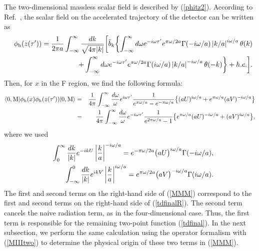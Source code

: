 \documentclass[aps,prd,preprintnumbers,nofootinbib,showpacs]{revtex4}%
\begin{document}
\begin{widetext}
The two-dimensional massless scalar field is described by (\ref{phitz2}). 
According to Ref.~\cite{HuRaval}, the scalar field on the accelerated 
trajectory of the detector can be written as
\begin{eqnarray}
&&\phi_{\rm h}(z(\tau^{\prime}))
=
{1\over 2 \pi a}
\int_{-\infty}^{\infty} {dk\over \sqrt{4\pi |k|}} 
\biggl[\hat b_k\biggl\{
\int_{-\infty}^{\infty} d\omega 
e^{-i\omega \tau'} e^{\pi \omega / 2a}
\Gamma(-{i\omega/ a}) \left|{k/ a}\right|^{i\omega / a}\theta(k) 
\nonumber\\
&&~~~~~~~~~~~~~~~
+
\int_{-\infty}^{\infty} d\omega 
e^{-i\omega \tau'} e^{\pi \omega / 2a}
\Gamma({i\omega / a}) \left|{k / a}\right|^{-i\omega / a} \theta(-k) \biggr\}
+h.c.\biggr].
\label{2MphiO}
\end{eqnarray}
Then, for $x$ in the F region, we find the following formula:
\begin{eqnarray}
\langle 0,{\rm M}| 
\phi_{\rm h}(x) \phi_{\rm h} (z(\tau'))|0, {\rm M}\rangle
&=&{1\over {4 \pi }}\int_{-\infty}^{\infty} {d\omega\over \omega}
e^{i\omega \tau^{\prime}} 
{1\over e^{\pi\omega/a}-e^{-\pi\omega/a}}
\bigl\{
({aU})^{{i\omega / a}} 
+  e^{\pi\omega/a}({aV})^{-i\omega /a}\bigr\}
\nonumber \\
&=&{1\over {4 \pi }}\int_{-\infty}^{\infty} {d\omega\over \omega}
e^{-i\omega \tau^{\prime}} 
{1\over e^{2\pi\omega/a}-1}
\bigl\{e^{\pi\omega/a}
({aU})^{{-i\omega / a}} 
+  ({aV})^{i\omega /a}\bigr\},
\label{MMM}
\end{eqnarray}
where we used  
\begin{eqnarray}
&&\int_0 ^{\infty} {dk \over |k|} e^{-ikU}
\left|{k \over a}\right|^{-i\omega / a}
=
e^{-{\pi \omega / 2a}}
\bigl( { aU} \bigr) ^{{i\omega /a}}
\Gamma(-{i\omega /a}),
\nonumber\\
&&\int_{-\infty} ^0 {dk \over |k|} e^{ikV}
\left|{k \over a}\right|^{i\omega / a} 
=
e^{\pi \omega / 2a}
\bigl( {aV} \bigr) ^{-i\omega /a}
\Gamma({i\omega/ a}).
\nonumber
\end{eqnarray}
The first and second terms on the right-hand side of (\ref{MMM})
correspond to the first and second terms on the right-hand side of 
(\ref{tdfinalR}).
The second term cancels the naive radiation term, as in the four-dimensional case.
Thus, the first term is responsible for the remaining two-point function (\ref{tdfinal}).
In the next subsection, we perform the same calculation
using the operator formalism with (\ref{MIIItwo}) to determine the physical origin of 
these two terms in (\ref{MMM}).




\end{widetext}
\end{document}
